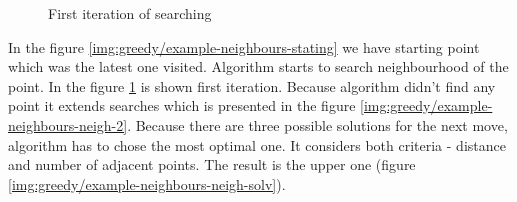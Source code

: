 \documentclass[titlepage]{article}
\newcommand{\multifigcaption}{\captionsetup{justification=justified}}
\begin{document}
\begin{figure}[H]
\begin{center}
\begin{minipage}{.45\linewidth}
 			\multifigcaption
 			\caption{First iteration of searching \newline \newline \vspace{4mm}}
 			\label{img:greedy/example-neighbours-neigh-1} 
 		\end{minipage}
	\end{center}
\end{figure}

In the figure \ref{img:greedy/example-neighbours-stating} we have starting point which was the latest one visited. Algorithm starts to search neighbourhood of the point. In the figure \ref{img:greedy/example-neighbours-neigh-1} is shown first iteration. Because algorithm didn't find any point it extends searches which is presented in the figure \ref{img:greedy/example-neighbours-neigh-2}. Because there are three possible solutions for the next move, algorithm has to chose the most optimal one. It considers both criteria - distance and number of adjacent points. The result is the upper one (figure \ref{img:greedy/example-neighbours-neigh-solv}).
\end{document}
